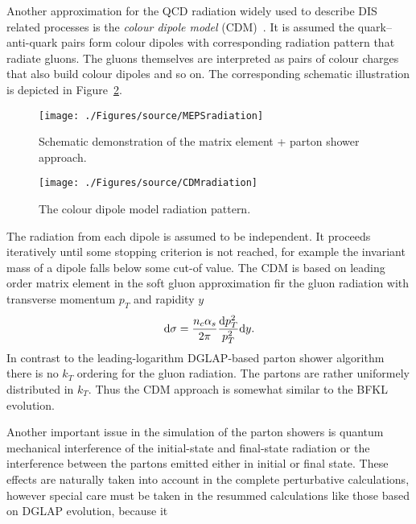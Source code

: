 Another approximation for the QCD radiation widely used to describe DIS related processes is the \emph{colour dipole model} (CDM)~\cite{cdm}. It is assumed the quark--anti-quark pairs form colour dipoles with corresponding radiation pattern that radiate gluons. The gluons themselves are interpreted as pairs of colour charges that also build colour dipoles and so on. The corresponding schematic illustration is depicted in Figure~\ref{fig:cdm}. 
\begin{figure}[t]
	\centering
		\texttt{[image: ./Figures/source/MEPSradiation]}
	\caption{Schematic demonstration of the matrix element + parton shower approach.}
\label{fig:meps}
\end{figure}
\begin{figure}[t]%
\centering
\texttt{[image: ./Figures/source/CDMradiation]}%
\caption{The colour dipole model radiation pattern.}%
\label{fig:cdm}%
\end{figure}
The radiation from each dipole is assumed to be independent. It proceeds iteratively until some stopping criterion is not reached, for example the invariant mass of a dipole falls below some cut-of  value. The CDM is based on leading order matrix element in the soft gluon approximation fir the gluon radiation with transverse momentum $p_T$ and rapidity $y$
\begin{equation}
\mathrm{d}\sigma = \frac{n_c\mbox{$\alpha_{s}$}}{2\pi}\frac{\mathrm{d}p_T^2}{p_T^2}\mathrm{d}y.
\end{equation}
In contrast to the leading-logarithm DGLAP-based parton shower algorithm there is no $k_T$ ordering for the gluon radiation. The partons are rather uniformely distributed in $k_T$. Thus the CDM approach is somewhat similar to the BFKL evolution.

Another important issue in the simulation of the parton showers is quantum mechanical interference of the initial-state and final-state radiation or the interference between the partons emitted either in initial or final state. These effects are naturally taken into account in the complete perturbative calculations, however special care must be taken in the resummed calculations like those based on DGLAP evolution, because it 

